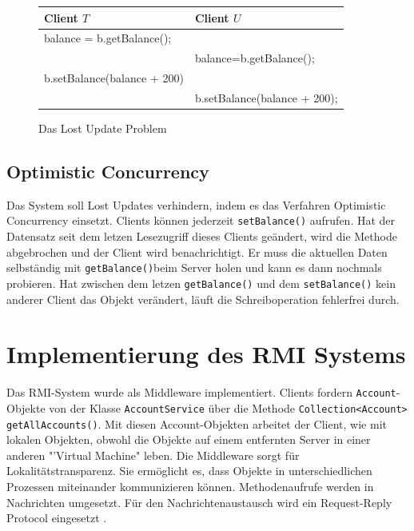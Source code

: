 \begin{figure}[h]
  \centering

\begin{tabular}{l | l}
  \textbf{Client $T$} & \textbf{Client $U$} \\ \hline
balance = b.getBalance(); &  \\
 & balance=b.getBalance();  \\
b.setBalance(balance + 200) & \\
& b.setBalance(balance + 200);  \\ \hline
\end{tabular}
    
  \caption{Das Lost Update Problem}
  \label{fig:lostupdate}
\end{figure}

\subsection{Optimistic Concurrency}
\label{sec:optim-conc}

Das System soll Lost Updates verhindern, indem es das Verfahren
Optimistic Concurrency \cite{wiki:optimistic-concurrency} einsetzt. Clients
können jederzeit \verb|setBalance()| aufrufen. Hat der Datensatz seit
dem letzen Lesezugriff dieses Clients geändert, wird die Methode
abgebrochen und der Client wird benachrichtigt. Er muss die aktuellen Daten
selbständig mit \verb|getBalance()|beim Server holen und kann es dann
nochmals probieren. Hat zwischen dem letzen \texttt{getBalance()} und
dem \texttt{setBalance()} kein anderer Client das Objekt verändert,
läuft die Schreiboperation fehlerfrei durch.

\section{Implementierung des RMI Systems}
\label{sec:impl-des-eigen}

Das RMI-System wurde als Middleware implementiert. Clients fordern \newline
\texttt{Ac\-co\-unt}\--Objekte von der Klasse \texttt{AccountService} über die
Methode \newline \texttt{Collection<Account> getAllAccounts()}. Mit diesen
Account-Ob\-jek\-ten arbeitet der Client, wie mit lokalen Objekten, obwohl
die Objekte auf einem entfernten Server in einer anderen "'Virtual
Machine" leben. Die
Middleware sorgt für Lokalitätstransparenz. Sie 
ermöglicht es, dass Objekte in unterschiedlichen Prozessen miteinander
kommunizieren können. Methodenaufrufe werden in Nachrichten umgesetzt.
Für den Nachrichtenaustausch wird ein Request-Reply Protocol eingesetzt \cite{coulouris88}.

